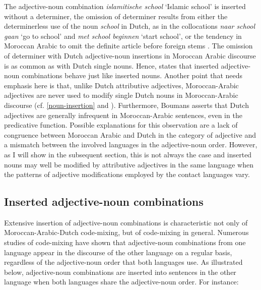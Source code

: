 \noindent The adjective-noun combination \textit{islamitische school} `Islamic school' is inserted without a determiner, the omission of determiner results from either the determinerless use of the noun \textit{school} in Dutch, as in the collocations \textit{naar school gaan} `go to school' and \textit{met school beginnen} `start school', or the tendency in Moroccan Arabic to omit the definite article before foreign stems \citep[cf.][187]{boumans-syntax-1998}. The omission of determiner with Dutch adjective-noun insertions in Moroccan Arabic discourse is as common as with Dutch single nouns. Hence, \citet[205]{boumans-syntax-1998} states that inserted adjective-noun combinations behave just like inserted nouns. Another point that needs emphasis here is that, unlike Dutch attributive adjectives, Moroccan-Arabic adjectives are never used to modify single Dutch nouns in Moroccan-Arabic discourse (cf. \ref{noun-insertion} and \citealt[][201]{boumans-syntax-1998}). Furthermore, Boumans asserts that Dutch adjectives are generally infrequent in Moroccan-Arabic sentences, even in the predicative function. Possible explanations for this observation are a lack of congruence between Moroccan Arabic and Dutch in the category of adjective and a mismatch between the involved languages in the adjective-noun order. However, as I will show in the subsequent section, this is not always the case and inserted nouns may well be modified by attributive adjectives in the same language when the patterns of adjective modifications employed by the contact languages vary.

\subsection{Inserted adjective-noun combinations}
Extensive insertion of adjective-noun combinations is characteristic not only of Moroccan-Arabic-Dutch code-mixing, but of code-mixing in general. Numerous studies of code-mixing have shown that adjective-noun combinations from one language appear in the discourse of the other language on a regular basis, regardless of the adjective-noun order that both languages use. As illustrated below, adjective-noun combinations are inserted into sentences in the other language when both languages share the adjective-noun order. For instance:

